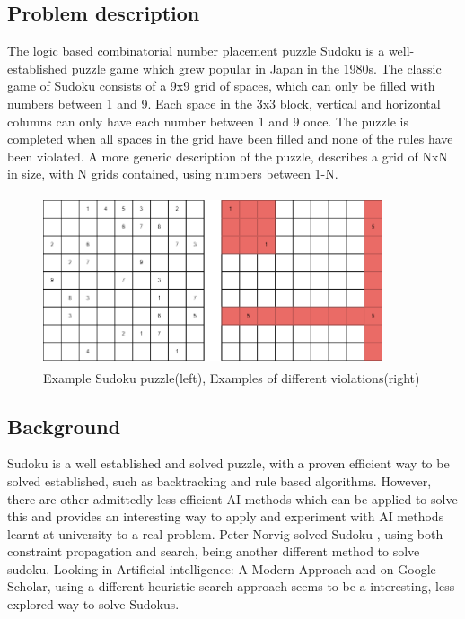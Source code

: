\documentclass[a4paper,11pt]{article}
\begin{document}
\subsection{Problem description}
The logic based combinatorial number placement puzzle Sudoku is a well-established puzzle game which grew popular in Japan in the 1980s\cite{sudokuWiki}. The classic game of Sudoku consists of a 9x9 grid of spaces, which can only be filled with numbers between 1 and 9. Each space in the 3x3 block, vertical and horizontal columns can only have each number between 1 and 9 once. The puzzle is completed when all spaces in the grid have been filled and none of the rules have been violated. A more generic description of the puzzle, describes a grid of NxN in size, with N grids contained, using numbers between 1-N.\cite{sudoku.com}
\begin{figure}[H]
	\centering
	\includegraphics[height=5cm, width=10cm]{./Diagrams/violationExample}
	\caption{Example Sudoku puzzle(left), Examples of different violations(right)}
\end{figure}

\subsection{Background}
Sudoku is a well established and solved puzzle, with a proven efficient way to be solved established, such as backtracking and rule based algorithms\cite{backtrackRef}. However, there are other admittedly less efficient AI methods which can be applied to solve this and provides an interesting way to apply and experiment with AI methods learnt at university to a real problem. Peter Norvig solved Sudoku \cite{norvigWebsite}, using both constraint propagation and search, being another different method to solve sudoku. Looking in Artificial intelligence: A Modern Approach\cite{modernAI} and on Google Scholar, using a different heuristic search approach seems to be a interesting, less explored way to solve Sudokus. \newline \newline
\end{document}

